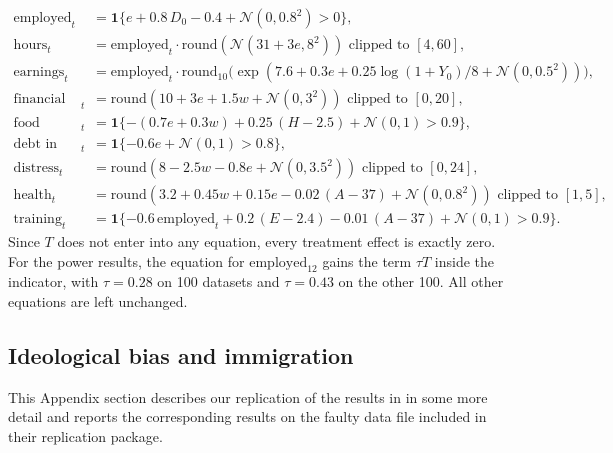 \documentclass[10pt]{article}
\begin{document}
\begin{align*}
\text{employed}_t &= \mathbf{1}\{e + 0.8\,D_0 - 0.4 + \mathcal{N}(0, 0.8^2) > 0\}, \\
\text{hours}_t &= \text{employed}_t \cdot \mathrm{round}(\mathcal{N}(31 + 3e, 8^2)) \text{ clipped to } [4, 60], \\
\text{earnings}_t &= \text{employed}_t \cdot \mathrm{round}_{10}\bigl(\exp(7.6 + 0.3e + 0.25\log(1 + Y_0)/8 + \mathcal{N}(0, 0.5^2))\bigr), \\
\text{financial security}_t &= \mathrm{round}(10 + 3e + 1.5w + \mathcal{N}(0, 3^2)) \text{ clipped to } [0, 20], \\
\text{food insecure}_t &= \mathbf{1}\{-(0.7e + 0.3w) + 0.25\,(H - 2.5) + \mathcal{N}(0, 1) > 0.9\}, \\
\text{debt in collections}_t &= \mathbf{1}\{-0.6e + \mathcal{N}(0, 1) > 0.8\}, \\
\text{distress}_t &= \mathrm{round}(8 - 2.5w - 0.8e + \mathcal{N}(0, 3.5^2)) \text{ clipped to } [0, 24], \\
\text{health}_t &= \mathrm{round}(3.2 + 0.45w + 0.15e - 0.02\,(A - 37) + \mathcal{N}(0, 0.8^2)) \text{ clipped to } [1, 5], \\
\text{training}_t &= \mathbf{1}\{-0.6\,\text{employed}_t + 0.2\,(E - 2.4) - 0.01\,(A - 37) + \mathcal{N}(0, 1) > 0.9\}.
\end{align*}
 Since $T$ does not enter into any equation, every treatment effect is exactly zero. For the power results, the equation for $\text{employed}_{12}$ gains the term $\tau T$ inside the indicator, with $\tau=0.28$ on 100 datasets and $\tau=0.43$ on the other 100. All other equations are left unchanged.

\subsection{Ideological bias and immigration}\label{app:immigration}

This Appendix section describes our replication of the results in \citet{miao2026agentic} in some more detail and reports the corresponding results on the faulty data file included in their replication package.
\end{document}
